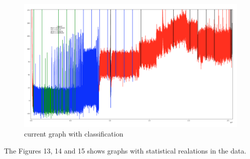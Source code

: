     \begin{figure}[H]
        \center
        \includegraphics[width=15cm]{images/images_folder_3/data3current.png}
        \caption{current graph with classification}
    \end{figure}

    The Figures 13, 14 and 15 shows graphs with statistical realations in the data. 


